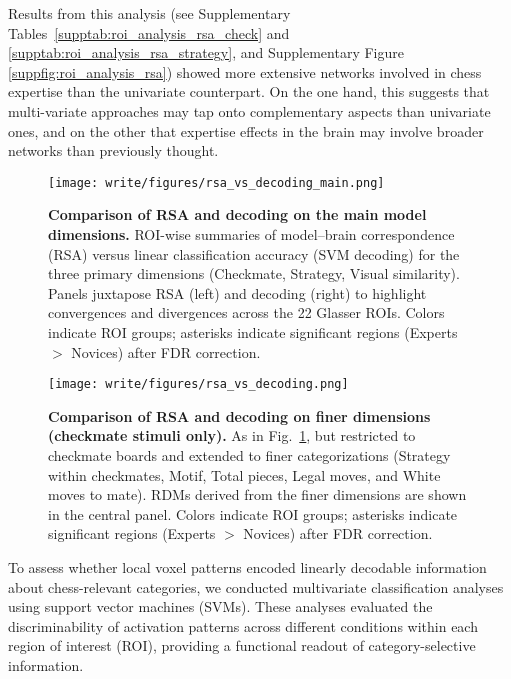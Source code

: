 Results from this analysis (see Supplementary Tables~\ref{supptab:roi_analysis_rsa_check} and \ref{supptab:roi_analysis_rsa_strategy}, and Supplementary Figure \ref{suppfig:roi_analysis_rsa}) showed more extensive networks involved in chess expertise than the univariate counterpart. On the one hand, this suggests that multi-variate approaches may tap onto complementary aspects than univariate ones, and on the other that expertise effects in the brain may involve broader networks than previously thought.

\begin{figure}[!htp]
  \centering
  \texttt{[image: write/figures/rsa\_vs\_decoding\_main.png]}
    \caption{\textbf{Comparison of RSA and decoding on the main model dimensions.} ROI-wise summaries of model–brain correspondence (RSA) versus linear classification accuracy (SVM decoding) for the three primary dimensions (Checkmate, Strategy, Visual similarity). Panels juxtapose RSA (left) and decoding (right) to highlight convergences and divergences across the 22 Glasser ROIs. Colors indicate ROI groups; asterisks indicate significant regions (Experts $>$ Novices) after FDR correction.}
      \label{suppfig:rsa_vs_decoding_main}
\end{figure}

\begin{figure}[!htp]
  \centering
  \texttt{[image: write/figures/rsa\_vs\_decoding.png]}
    \caption{\textbf{Comparison of RSA and decoding on finer dimensions (checkmate stimuli only).} As in Fig.~\ref{suppfig:rsa_vs_decoding_main}, but restricted to checkmate boards and extended to finer categorizations (Strategy within checkmates, Motif, Total pieces, Legal moves, and White moves to mate). RDMs derived from the finer dimensions are shown in the central panel. Colors indicate ROI groups; asterisks indicate significant regions (Experts $>$ Novices) after FDR correction.}
      \label{suppfig:rsa_vs_decoding_finer}
\end{figure}

\label{suppsec:brain-decoding}
To assess whether local voxel patterns encoded linearly decodable information about chess-relevant categories, we conducted multivariate classification analyses using support vector machines (SVMs). These analyses evaluated the discriminability of activation patterns across different conditions within each region of interest (ROI), providing a functional readout of category-selective information.

